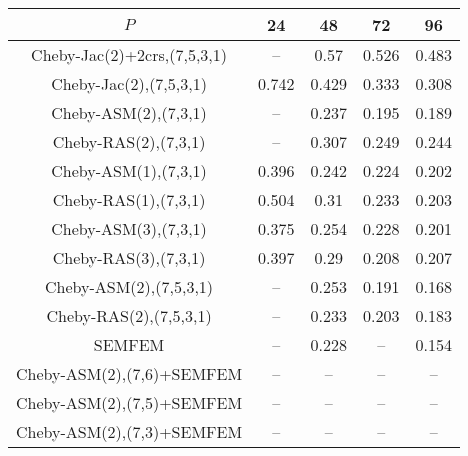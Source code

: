 \begin{table*}
\centering
\begin{tabular}{||c||cccc||}
	\hline
	$P$ & 24 & 48 & 72 & 96 \\
	\hline\hline
	Cheby-Jac(2)+2crs,(7,5,3,1)	&	 --	&	0.57	&	0.526	&	0.483\\
	Cheby-Jac(2),(7,5,3,1)	&	0.742	&	0.429	&	0.333	&	0.308\\
	Cheby-ASM(2),(7,3,1)	&	 --	&	0.237	&	0.195	&	0.189\\
	Cheby-RAS(2),(7,3,1)	&	 --	&	0.307	&	0.249	&	0.244\\
	Cheby-ASM(1),(7,3,1)	&	0.396	&	0.242	&	0.224	&	0.202\\
	Cheby-RAS(1),(7,3,1)	&	0.504	&	0.31	&	0.233	&	0.203\\
	Cheby-ASM(3),(7,3,1)	&	0.375	&	0.254	&	0.228	&	0.201\\
	Cheby-RAS(3),(7,3,1)	&	0.397	&	0.29	&	0.208	&	0.207\\
	Cheby-ASM(2),(7,5,3,1)	&	 --	&	0.253	&	0.191	&	0.168\\
	Cheby-RAS(2),(7,5,3,1)	&	 --	&	0.233	&	0.203	&	0.183\\
	SEMFEM	&	 --	&	0.228	&	 --	&	0.154\\
	Cheby-ASM(2),(7,6)+SEMFEM	&	 --	&	 --	&	 --	&	 --\\
	Cheby-ASM(2),(7,5)+SEMFEM	&	 --	&	 --	&	 --	&	 --\\
	Cheby-ASM(2),(7,3)+SEMFEM	&	 --	&	 --	&	 --	&	 --\\
\hline
\end{tabular}
\caption{\label{table:foobar}}
\end{table*}
